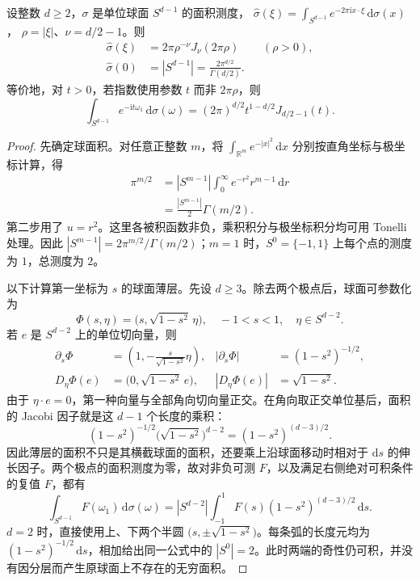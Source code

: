 \begin{theorem}
\label{b2:thm:A2-sphere-fourier}
设整数 \(d\ge2\)，\(\sigma\) 是单位球面 \(S^{d-1}\) 的面积测度，
\(\widehat\sigma(\xi)=\int_{S^{d-1}}e^{-2\pi\mathrm i x\cdot\xi}\,\mathrm d\sigma(x)\)，
\(\rho=|\xi|\)、\(\nu=d/2-1\)。则
\[
\begin{aligned}
 \widehat\sigma(\xi)&=2\pi\rho^{-\nu}J_\nu(2\pi\rho)
 &&(\rho>0),\\
 \widehat\sigma(0)&=|S^{d-1}|=\frac{2\pi^{d/2}}{\Gamma(d/2)}.
\end{aligned}
\]
等价地，对 \(t>0\)，若指数使用参数 \(t\) 而非 \(2\pi\rho\)，则
\[
 \int_{S^{d-1}}e^{-\mathrm i t\omega_1}\,\mathrm d\sigma(\omega)
 =(2\pi)^{d/2}t^{1-d/2}J_{d/2-1}(t).
\]
\end{theorem}
\begin{proof}
先确定球面积。对任意正整数 \(m\)，将
\(\int_{\mathbb R^m}e^{-|x|^2}\,\mathrm dx\) 分别按直角坐标与极坐标计算，得
\[
\begin{aligned}
 \pi^{m/2}
 &=|S^{m-1}|\int_0^\infty e^{-r^2}r^{m-1}\,\mathrm dr\\
 &=\frac{|S^{m-1}|}{2}\Gamma(m/2).
\end{aligned}
\]
第二步用了 \(u=r^2\)。这里各被积函数非负，乘积积分与极坐标积分均可用 Tonelli 处理。因此
\(|S^{m-1}|=2\pi^{m/2}/\Gamma(m/2)\)；\(m=1\) 时，\(S^0=\{-1,1\}\) 上每个点的测度为 \(1\)，总测度为 \(2\)。

以下计算第一坐标为 \(s\) 的球面薄层。先设 \(d\ge3\)。除去两个极点后，球面可参数化为
\[
 \Phi(s,\eta)=\bigl(s,\sqrt{1-s^2}\,\eta\bigr),
 \quad -1<s<1,\quad \eta\in S^{d-2}.
\]
若 \(e\) 是 \(S^{d-2}\) 上的单位切向量，则
\[
\begin{aligned}
 \partial_s\Phi&=\left(1,-\frac{s}{\sqrt{1-s^2}}\eta\right),
 &|\partial_s\Phi|&=(1-s^2)^{-1/2},\\
 D_\eta\Phi(e)&=\bigl(0,\sqrt{1-s^2}\,e\bigr),
 &|D_\eta\Phi(e)|&=\sqrt{1-s^2}.
\end{aligned}
\]
由于 \(\eta\cdot e=0\)，第一种向量与全部角向切向量正交。在角向取正交单位基后，面积的 Jacobi 因子就是这 \(d-1\) 个长度的乘积：
\[
 (1-s^2)^{-1/2}
 \bigl(\sqrt{1-s^2}\bigr)^{d-2}
 =(1-s^2)^{(d-3)/2}.
\]
因此薄层的面积不只是其横截球面的面积，还要乘上沿球面移动时相对于 \(\mathrm ds\) 的伸长因子。两个极点的面积测度为零，故对非负可测 \(F\)，以及满足右侧绝对可积条件的复值 \(F\)，都有
\[
 \int_{S^{d-1}}F(\omega_1)\,\mathrm d\sigma(\omega)
 =|S^{d-2}|\int_{-1}^1F(s)(1-s^2)^{(d-3)/2}\,\mathrm ds.
\]
\(d=2\) 时，直接使用上、下两个半圆
\(\bigl(s,\pm\sqrt{1-s^2}\bigr)\)。每条弧的长度元均为
\((1-s^2)^{-1/2}\,\mathrm ds\)，相加给出同一公式中的
\(|S^0|=2\)。此时两端的奇性仍可积，并没有因分层而产生原球面上不存在的无穷面积。


\end{proof}
